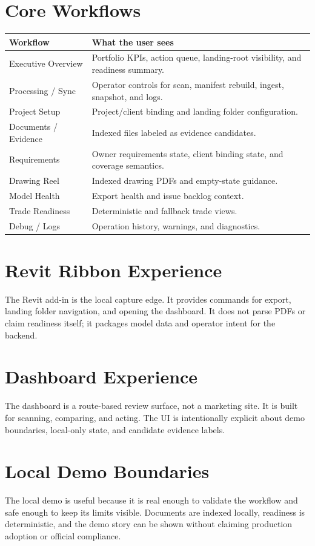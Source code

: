 \documentclass[11pt]{article}
\begin{document}
\section{Core Workflows}
\begin{tabularx}{\textwidth}{@{}lX@{}}
\toprule
Workflow & What the user sees \\
\midrule
Executive Overview & Portfolio KPIs, action queue, landing-root visibility, and readiness summary. \\
Processing / Sync & Operator controls for scan, manifest rebuild, ingest, snapshot, and logs. \\
Project Setup & Project/client binding and landing folder configuration. \\
Documents / Evidence & Indexed files labeled as evidence candidates. \\
Requirements & Owner requirements state, client binding state, and coverage semantics. \\
Drawing Reel & Indexed drawing PDFs and empty-state guidance. \\
Model Health & Export health and issue backlog context. \\
Trade Readiness & Deterministic and fallback trade views. \\
Debug / Logs & Operation history, warnings, and diagnostics. \\
\bottomrule
\end{tabularx}

\section{Revit Ribbon Experience}
The Revit add-in is the local capture edge. It provides commands for export, landing folder navigation, and opening the dashboard. It does not parse PDFs or claim readiness itself; it packages model data and operator intent for the backend.

\section{Dashboard Experience}
The dashboard is a route-based review surface, not a marketing site. It is built for scanning, comparing, and acting. The UI is intentionally explicit about demo boundaries, local-only state, and candidate evidence labels.

\section{Local Demo Boundaries}
The local demo is useful because it is real enough to validate the workflow and safe enough to keep its limits visible. Documents are indexed locally, readiness is deterministic, and the demo story can be shown without claiming production adoption or official compliance.
\end{document}

